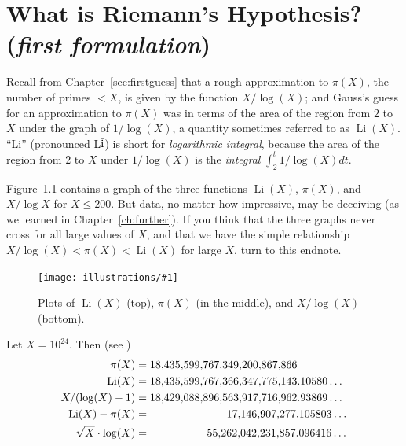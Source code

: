 \documentclass[openany]{book}
\DeclareMathOperator{\Li}{Li}
\newcommand{\ill}[3]{%
   \begin{figure}[H]%
   \vspace{-2ex}
   \centering%
   \texttt{[image: illustrations/\#1]}%
   \caption{#3}%
   \vspace{-2ex}
    \end{figure}}
\theoremstyle{plain}
\theoremstyle{definition}
\begin{document}
{{\chapter[What is Riemann's Hypothesis?] { What is Riemann's Hypothesis?  ({\em first formulation})\label{sec:rh1}}



Recall from Chapter~\ref{sec:firstguess} that a rough approximation to
$\pi(X)$, the number of primes $< X$, is given by the function
$X/\log(X)$; and Gauss's guess for an approximation to $\pi(X)$ was in
terms of the area of the region from $2$ to $X$ under the graph of
$1/\log(X)$, a quantity sometimes referred to as $\Li(X)$.
``Li'' (pronounced L$\overline{\rm i}$) is short for {\em logarithmic integral},
because the area of the region from $2$ to $X$ under $1/\log(X)$
is the {\em integral} $\int_2^t 1/\log(X) dt$.

Figure~\ref{fig:threeplots} contains a graph of the three functions
$\Li(X)$, $\pi(X)$, and $X/\log X$ for $X\leq 200$.
But data, no matter how impressive, may be deceiving (as we learned in
Chapter~\ref{ch:further}). If you think
that  the three graphs  never cross for all large values of $X$,  and
that we have the simple relationship  $X/\log(X) < \pi(X) < \Li(X)$ for
large $X$, turn to this endnote.


\ill{three_plots}{.9}{Plots of $\Li(X)$ (top), $\pi(X)$ (in the middle), and $X/\log(X)$ (bottom).\label{fig:threeplots}}

Let $X=10^{24}$.  Then \label{pili_vals} (see )
\begin{align*}
  \pi(X) &= 18{,}435{,}599{,}767{,}349{,}200{,}867{,}866\\
  \Li(X) &= 18{,}435{,}599{,}767{,}366{,}347{,}775{,}143.10580\ldots \\
  X/(\log(X)-1)  &=
            18{,}429{,}088{,}896{,}563{,}917{,}716{,}962.93869\ldots\\
  \Li(X) - \pi(X) &= \hspace{7em}
     17{,}146{,}907{,}277.105803\ldots\\
  \sqrt{X}\cdot \log(X) &= \hspace{5.2em}
     55{,}262{,}042{,}231{,}857.096416 \ldots
\end{align*}


}}
\end{document}
